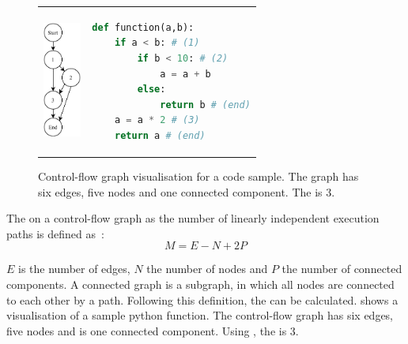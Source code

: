 \begin{figure}
\begin{tabular}{p{}p{}}
    \begin{minipage}{0.45\textwidth}
        \centering
    \includegraphics[height=1.5in]{img/Background/control-flow-graph.pdf}
    \label{fig:background_control_flow_graph_image}
    \end{minipage}
&
\begin{minipage}[c]{0.45\textwidth}
\centering
\begin{lstlisting}[language=Python, label=lst:background_control_flow_graph_listing]
def function(a,b):
    if a < b: # (1)
        if b < 10: # (2)
            a = a + b
        else:
            return b # (end)
    a = a * 2 # (3)
    return a # (end)
\end{lstlisting}
\end{minipage}
\end{tabular}
\caption{Control-flow graph visualisation for a code sample. The graph has six edges, five nodes and one connected component. The  is 3.}
\label{fig:background_control_flow_graph}
\end{figure}

The  on a control-flow graph as the number of linearly independent execution paths is defined as~\cite{mccabe_complexity_1976}:
\begin{equation}\label{eq:cyclomatic_complexity}
M = E - N + 2P
\end{equation}

$E$ is the number of edges, $N$ the number of nodes and $P$ the number of connected components.  A connected graph is a subgraph, in which all nodes are connected to each other by a path. Following this definition, the  can be calculated.  shows a visualisation of a sample python function. The control-flow graph has six edges, five nodes and is one connected component. Using , the  is 3.

